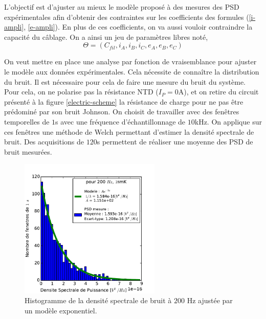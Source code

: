 L'objectif est d'ajuster au mieux le modèle proposé à des mesures des PSD expérimentales afin d'obtenir des contraintes sur les coefficients des formules (\ref{i-ampli}, \ref{e-ampli}). En plus de ces coefficients, on va aussi vouloir contraindre la capacité du câblage. On a ainsi un jeu de paramètres libres noté,
\begin{equation}
\Theta=(C_{fil}, i_A, i_B, i_C, e_A, e_B, e_C)
\end{equation}

On veut mettre en place une analyse par fonction de vraisemblance pour ajuster le modèle aux données expérimentales. Cela nécessite de connaître la distribution du bruit. Il est nécessaire pour cela de faire une mesure du bruit du système. Pour cela, on ne polarise pas la résistance NTD ($I_P=0$A), et on retire du circuit présenté à la figure \ref{electric-scheme} la résistance de charge pour ne pas être prédominé par son bruit Johnson. On choisit de travailler avec des fenêtres temporelles de $1$s avec une fréquence d'échantillonnage de $10$kHz. On applique sur ces fenêtres une méthode de Welch permettant d'estimer la densité spectrale de bruit. Des acquisitions de $120$s permettent de réaliser une moyenne des PSD de bruit mesurées.

\begin{figure}[!ht]
\begin{center}
\includegraphics[width=0.6\textwidth]{Images/fit_exp_fin.pdf}
\end{center}
\caption{Histogramme de la densité spectrale de bruit à $200$ Hz ajustée par un modèle exponentiel.}
\label{noise-form}
\end{figure}


